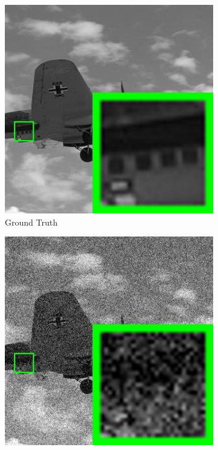\begin{figure}
    \centering
    \begin{subfigure}[t]{0.24\textwidth}
        \centering
        \includegraphics[width=1\textwidth]{images/pgpd/200img/br_3063.jpg}
	   \caption{Ground Truth}
    \end{subfigure}
    \hfill
    \begin{subfigure}[t]{0.24\textwidth}
        \centering
        \includegraphics[width=1\textwidth]{images/pgpd/200img/br_30_3063.jpg}

\end{subfigure}
\end{figure}
